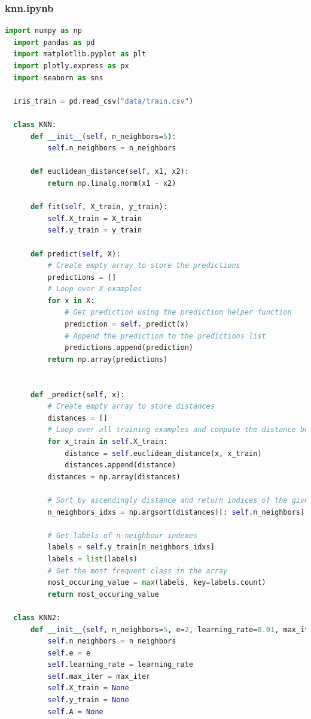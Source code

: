 \documentclass[12pt]{article}
\begin{document}
\subsubsection{knn.ipynb}
\begin{lstlisting}[language=Python]
  import numpy as np
  import pandas as pd
  import matplotlib.pyplot as plt
  import plotly.express as px
  import seaborn as sns
  
  iris_train = pd.read_csv("data/train.csv") 
  
  class KNN:
      def __init__(self, n_neighbors=5):
          self.n_neighbors = n_neighbors
          
      def euclidean_distance(self, x1, x2):
          return np.linalg.norm(x1 - x2)
  
      def fit(self, X_train, y_train):
          self.X_train = X_train
          self.y_train = y_train
  
      def predict(self, X):
          # Create empty array to store the predictions
          predictions = []
          # Loop over X examples
          for x in X:
              # Get prediction using the prediction helper function
              prediction = self._predict(x)
              # Append the prediction to the predictions list
              predictions.append(prediction)
          return np.array(predictions)
      
  
      def _predict(self, x):
          # Create empty array to store distances
          distances = []
          # Loop over all training examples and compute the distance between x and all the training examples 
          for x_train in self.X_train:
              distance = self.euclidean_distance(x, x_train)
              distances.append(distance)
          distances = np.array(distances)
          
          # Sort by ascendingly distance and return indices of the given n neighbours
          n_neighbors_idxs = np.argsort(distances)[: self.n_neighbors]
          
          # Get labels of n-neighbour indexes
          labels = self.y_train[n_neighbors_idxs]                  
          labels = list(labels)
          # Get the most frequent class in the array
          most_occuring_value = max(labels, key=labels.count)
          return most_occuring_value
      
  class KNN2:
      def __init__(self, n_neighbors=5, e=2, learning_rate=0.01, max_iter=100):
          self.n_neighbors = n_neighbors
          self.e = e
          self.learning_rate = learning_rate
          self.max_iter = max_iter
          self.X_train = None
          self.y_train = None
          self.A = None
          

\end{lstlisting}
\end{document}
